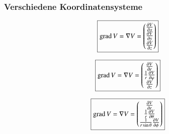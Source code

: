 \subsubsection{Verschiedene Koordinatensysteme}
\[
    \boxed{
        \operatorname{grad} V
        = \nabla V
        = \begin{pmatrix}
            \frac{\partial V}{\partial x}\\
            \frac{\partial V}{\partial y}\\
            \frac{\partial V}{\partial z}\\
        \end{pmatrix}
    }
\]

\[
    \boxed{
        \operatorname{grad} V
        = \nabla V
        = \begin{pmatrix}
            \frac{\partial V}{\partial r}\\
            \frac{1}{r} \frac{\partial V}{\partial \varphi}\\
            \frac{\partial V}{\partial z}\\
        \end{pmatrix}
    }
\]

\[
    \boxed{
        \operatorname{grad} V
        = \nabla V
        = \begin{pmatrix}
            \frac{\partial V}{\partial r}\\
            \frac{1}{r} \frac{\partial V}{\partial \theta}\\
            \frac{1}{r \sin \theta} \frac{\partial V}{\partial \phi}\\
        \end{pmatrix}
    }
\]

